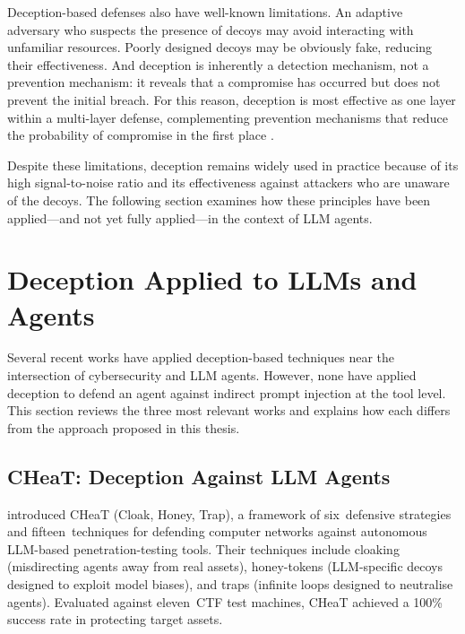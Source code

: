 \begin{justify}
Deception-based defenses also have well-known limitations.  An adaptive adversary who suspects the presence of decoys may avoid interacting with unfamiliar resources.  Poorly designed decoys may be obviously fake, reducing their effectiveness.  And deception is inherently a detection mechanism, not a prevention mechanism: it reveals that a compromise has occurred but does not prevent the initial breach.  For this reason, deception is most effective as one layer within a multi-layer defense, complementing prevention mechanisms that reduce the probability of compromise in the first place \citep{spitzner2003honeypots}.
\end{justify}

\begin{justify}
Despite these limitations, deception remains widely used in practice because of its high signal-to-noise ratio and its effectiveness against attackers who are unaware of the decoys.  The following section examines how these principles have been applied---and not yet fully applied---in the context of LLM agents.
\end{justify}


\section{Deception Applied to LLMs and Agents}
\label{sec:deception_ai}

\begin{justify}
Several recent works have applied deception-based techniques near the intersection of cybersecurity and LLM agents.  However, none have applied deception to defend an agent against indirect prompt injection at the tool level.  This section reviews the three most relevant works and explains how each differs from the approach proposed in this thesis.
\end{justify}

\subsection{CHeaT: Deception Against LLM Agents}

\begin{justify}
\cite{ayzenshteyn2025cloak} introduced CHeaT (Cloak, Honey, Trap), a framework of six~defensive strategies and fifteen~techniques for defending computer networks against autonomous LLM-based penetration-testing tools.  Their techniques include cloaking (misdirecting agents away from real assets), honey-tokens (LLM-specific decoys designed to exploit model biases), and traps (infinite loops designed to neutralise agents).  Evaluated against eleven~CTF test machines, CHeaT achieved a 100\% success rate in protecting target assets.
\end{justify}

